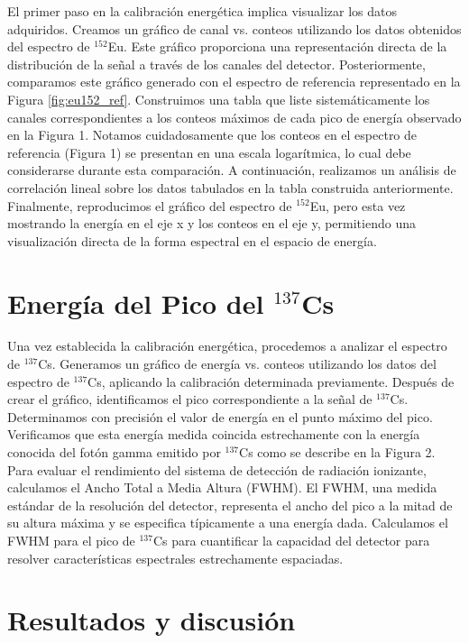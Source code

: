 \documentclass[twocolumn,a4paper,11pt]{scrartcl}
\begin{document}
El primer paso en la calibración energética implica visualizar los datos adquiridos. Creamos un gráfico de canal vs. conteos utilizando los datos obtenidos del espectro de $^{152}$Eu. Este gráfico proporciona una representación directa de la distribución de la señal a través de los canales del detector.  Posteriormente, comparamos este gráfico generado con el espectro de referencia representado en la Figura \ref{fig:eu152_ref}. Construimos una tabla que liste sistemáticamente los canales correspondientes a los conteos máximos de cada pico de energía observado en la Figura 1. Notamos cuidadosamente que los conteos en el espectro de referencia (Figura 1) se presentan en una escala logarítmica, lo cual debe considerarse durante esta comparación.  A continuación, realizamos un análisis de correlación lineal sobre los datos tabulados en la tabla construida anteriormente. Finalmente, reproducimos el gráfico del espectro de $^{152}$Eu, pero esta vez mostrando la energía en el eje x y los conteos en el eje y, permitiendo una visualización directa de la forma espectral en el espacio de energía.

\section{Energía del Pico del $^{137}$Cs}

Una vez establecida la calibración energética, procedemos a analizar el espectro de $^{137}$Cs. Generamos un gráfico de energía vs. conteos utilizando los datos del espectro de $^{137}$Cs, aplicando la calibración determinada previamente. Después de crear el gráfico, identificamos el pico correspondiente a la señal de $^{137}$Cs. Determinamos con precisión el valor de energía en el punto máximo del pico. Verificamos que esta energía medida coincida estrechamente con la energía conocida del fotón gamma emitido por $^{137}$Cs como se describe en la Figura 2. Para evaluar el rendimiento del sistema de detección de radiación ionizante, calculamos el Ancho Total a Media Altura (FWHM). El FWHM, una medida estándar de la resolución del detector, representa el ancho del pico a la mitad de su altura máxima y se especifica típicamente a una energía dada. Calculamos el FWHM para el pico de $^{137}$Cs para cuantificar la capacidad del detector para resolver características espectrales estrechamente espaciadas.

\section{Resultados y discusión}
\end{document}
